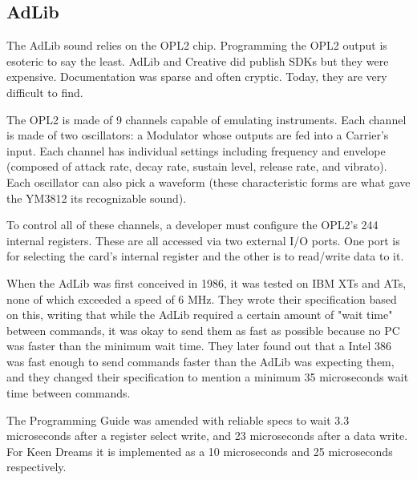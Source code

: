 \documentclass[book.tex]{subfiles}
\begin{document}
\subsection{AdLib}
The AdLib sound relies on the OPL2 chip. Programming the OPL2 output is esoteric to say the least. AdLib and Creative did publish SDKs but they were expensive.  Documentation was sparse and often cryptic. Today, they are very difficult to find.\\
\par
The OPL2 is made of 9 channels capable of emulating instruments. Each channel is made of two oscillators: a Modulator whose outputs are fed into a Carrier's input. Each channel has individual settings including frequency and envelope (composed of attack rate, decay rate, sustain level, release rate, and vibrato). Each oscillator can also pick a waveform (these characteristic forms are what gave the YM3812 its recognizable sound).\\
\par
 To control all of these channels, a developer must configure the OPL2's 244 internal registers. These are all accessed via two external I/O ports. One port is for selecting the card's internal register and the other is to read/write data to it.\\
\par
\begin{minipage}{\textwidth}

\end{minipage}
\par
When the AdLib was first conceived in 1986, it was tested on IBM XTs and ATs, none of which exceeded a speed of 6 MHz. They wrote their specification based on this, writing that while the AdLib required a certain amount of "wait time" between commands, it was okay to send them as fast as possible because no PC was faster than the minimum wait time. They later found out that a Intel 386 was fast enough to send commands faster than the AdLib was expecting them, and they changed their specification to mention a minimum 35 microseconds wait time between commands.\\

\par
The Programming Guide was amended with reliable specs to wait 3.3 microseconds after a register select write, and 23 microseconds after a data write. For Keen Dreams it is implemented as a 10 microseconds and 25 microseconds respectively.\\
\end{document}
